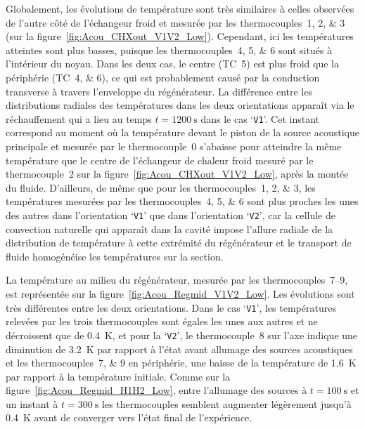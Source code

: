 Globalement, les évolutions de température sont très similaires à celles observées de l'autre côté de l'échangeur froid et mesurée par les thermocouples~\numlist{1;2;3} (sur la figure~\ref{fig:Acou_CHXout_V1V2_Low}). Cependant, ici les températures atteintes sont plus basses, puisque les thermocouples~\numlist{4;5;6} sont situés à l'intérieur du noyau. Dans les deux cas, le centre (TC~\num{5}) est plus froid que la périphérie (TC~\numlist{4;6}), ce qui est probablement causé par la conduction transverse à travers l'enveloppe du régénérateur. La différence entre les distributions radiales des températures dans les deux orientations apparaît via le réchauffement qui a lieu au temps $t=\qty{1200}{\second}$ dans le cas `\texttt{V1}'. Cet instant correspond au moment où la température devant le piston de la source acoustique principale et mesurée par le thermocouple~\num{0} s'abaisse pour atteindre la même température que le centre de l'échangeur de chaleur froid mesuré par le thermocouple~\num{2} sur la figure~\ref{fig:Acou_CHXout_V1V2_Low}, après la montée du fluide. D'ailleurs, de même que pour les thermocouples~\numlist{1;2;3}, les  températures mesurées par les thermocouples~\numlist{4;5;6} sont plus proches les unes des autres dans l'orientation `\texttt{V1}' que dans l'orientation `\texttt{V2}', car la cellule de convection naturelle qui apparaît dans la cavité impose l'allure radiale de la distribution de température à cette extrémité du régénérateur et le transport de fluide homogénéise les températures sur la section.\medskip

La température au milieu du régénérateur, mesurée par les thermocouples~\numrange{7}{9}, est représentée sur la figure~\ref{fig:Acou_Regmid_V1V2_Low}. Les évolutions sont très différentes entre les deux orientations. Dans le cas `\texttt{V1}', les températures relevées par les trois thermocouples sont égales les unes aux autres et ne décroissent que de \qty{.4}{\kelvin}, et pour la `\texttt{V2}', le thermocouple~\num{8} sur l'axe indique une diminution de \qty{3.2}{\kelvin} par rapport à l'état avant allumage des sources acoustiques et les thermocouples~\numlist{7;9} en périphérie, une baisse de la température de \qty{1.6}{\kelvin} par rapport à la température initiale. Comme sur la figure~\ref{fig:Acou_Regmid_H1H2_Low}, entre l'allumage des sources à $t=\qty{100}{\second}$ et un instant à $t=\qty{300}{\second}$ les thermocouples semblent augmenter légèrement jusqu'à \qty{.4}{\kelvin} avant de converger vers l'état final de l'expérience.\smallskip

